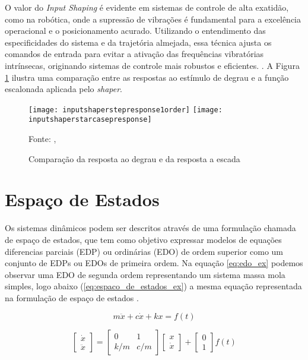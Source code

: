 O valor do \textit{Input Shaping} é evidente em sistemas de controle de alta exatidão, como na robótica, onde a supressão de vibrações é fundamental para a excelência operacional e o posicionamento acurado. Utilizando o entendimento das especificidades do sistema e da trajetória almejada, essa técnica ajusta os comandos de entrada para evitar a ativação das frequências vibratórias intrínsecas, originando sistemas de controle mais robustos e eficientes. \cite{singhose97}. A Figura \ref{fig:degr_vs_esc} ilustra uma comparação entre as respostas ao estímulo de degrau e a função escalonada aplicada pelo \textit{shaper}.

\begin{figure}[H]
    \centering
    \caption{Comparação da resposta ao degrau e da resposta a escada}
    \texttt{[image: inputshaperstepresponse1order]}
    \texttt{[image: inputshaperstarcasepresponse]}

    {\footnotesize Fonte: \citeauthor{singhose97}, \citeyear{singhose97}}
    \label{fig:degr_vs_esc}
\end{figure}

\section{Espaço de Estados}

Os sistemas dinâmicos podem ser descritos através de uma formulação chamada de espaço de estados, que tem como objetivo expressar modelos de equações diferencias parciais (EDP) ou ordinárias (EDO) de ordem superior como um conjunto de EDPs ou EDOs de primeira ordem. Na equação \ref{eq:edo_ex} podemos observar uma EDO de segunda ordem representando um sistema massa mola simples, logo abaixo (\ref{eq:espaco_de_estados_ex}) a mesma equação representada na formulação de espaço de estados \cite{hamilton94}.

\begin{equation}
    \label{eq:edo_ex}
    m \ddot x+c \dot x+kx = f(t)
\end{equation}

\begin{equation}
    \label{eq:espaco_de_estados_ex}
    \begin{bmatrix}
        \dot x \\
        \ddot x
    \end{bmatrix}
    =
    \begin{bmatrix}
        0 & 1 \\
        k/m & c/m
    \end{bmatrix}
    \begin{bmatrix}
        x \\
        \dot x
    \end{bmatrix}
    +
    \begin{bmatrix}
        0 \\
        1
    \end{bmatrix}
    f(t)
\end{equation}

